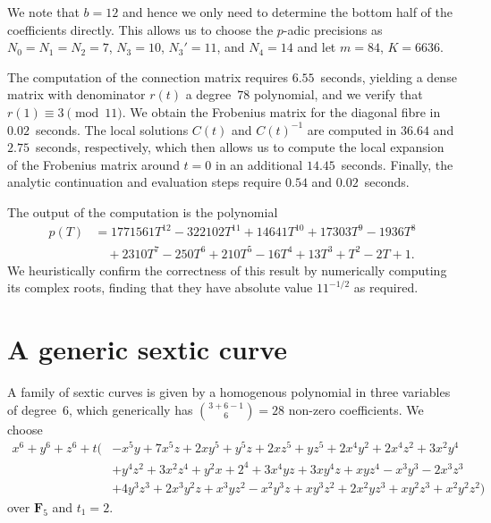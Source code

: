 We note that $b = 12$ and hence we only need to determine the 
bottom half of the coefficients directly.  This allows us to 
choose the $p$-adic precisions as $N_0 = N_1 = N_2 = 7$, 
$N_3 = 10$, $N_3' = 11$, and $N_4 = 14$ and let $m = 84$, $K = 6636$.

The computation of the connection matrix requires $6.55$~seconds, 
yielding a dense matrix with denominator $r(t)$ a degree~$78$ 
polynomial, and we verify that $r(1) \equiv 3 \pmod{11}$.  We obtain 
the Frobenius matrix for the diagonal fibre in $0.02$~seconds.  The 
local solutions $C(t)$ and $C(t)^{-1}$ are computed in $36.64$ and 
$2.75$~seconds, respectively, which then allows us to compute the 
local expansion of the Frobenius matrix around $t = 0$ in an additional 
$14.45$~seconds.  Finally, the analytic continuation and evaluation steps 
require $0.54$ and $0.02$~seconds.

The output of the computation is the polynomial 
\begin{equation*}
\begin{split}
p(T) & = 1771561 T^{12}-322102 T^{11}+14641 T^{10}+17303 T^9-1936 T^8 \\
     & \quad +2310 T^7-250 T^6+210 T^5-16 T^4+13 T^3+T^2-2 T+1.
\end{split}
\end{equation*}
We heuristically confirm the correctness of this result by 
numerically computing its complex roots, finding that they 
have absolute value $11^{-1/2}$ as required.

\section{A generic sextic curve}

A family of sextic curves is given by a homogenous polynomial 
in three variables of degree~$6$, which generically has 
$\binom{3+6-1}{6} = 28$ non-zero coefficients.  We choose 
\begin{equation*}
\begin{split}
x^6 + y^6 + z^6 + t \bigl( 
& - x^5 y + 7 x^5 z + 2 x y^5 + y^5 z + 2 x z^5 + y z^5 + 2 x^4 y^2 + 2 x^4 z^2 + 3 x^2 y^4 \\ 
& + y^4 z^2 + 3 x^2 z^4 + y^2 x + 2^4 + 3 x^4 y z + 3 x y^4 z + x y z^4 - x^3 y^3 - 2 x^3 z^3 \\
& + 4 y^3 z^3 + 2 x^3 y^2 z + x^3 y z^2 - x^2 y^3 z + x y^3 z^2 + 2 x^2 y z^3 + x y^2 z^3 
+ x^2 y^2 z^2 \bigr)
\end{split}
\end{equation*}
over $\mathbf{F}_{5}$ and $t_1 = 2$.

